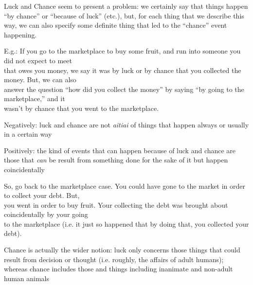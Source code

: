 \documentclass[11pt]{article}
\begin{document}
\noindent Luck and Chance seem to present a problem: we certainly say that things happen ``by chance'' or ``because of luck'' (etc.), but, for each thing that we describe this way, we can also specify some definite thing that led to the ``chance'' event happening.
\vspace*{2mm}

E.g.: If you go to the marketplace to buy some fruit, and run into someone you did not expect to meet\\\hspace*{6mm}that owes you money, we say it was by luck or by chance that you collected the money. But, we can also\\\hspace*{6mm}answer the question ``how did you collect the money'' by saying ``by going to the marketplace,'' and it\\\hspace*{6mm}wasn't by chance that you went to the marketplace.
\vspace{2mm}

\noindent Negatively: luck and chance are not \emph{aitiai} of things that happen always or usually in a certain way
\vspace*{2mm}

\noindent Positively: the kind of events that can happen because of luck and chance are those that \emph{can}  be result from something done for the sake of it but happen coincidentally
\vspace*{2mm}

So, go back to the marketplace case. You could have gone to the market in order to collect your debt. But,\\\hspace*{6mm}you went in order to buy fruit. Your collecting the debt was brought about coincidentally by your going\\\hspace*{6mm}to the marketplace (i.e. it just so happened that by doing that, you collected your debt).
\vspace*{2mm}

\noindent Chance is actually the wider notion: luck only concerns those things that could result from decision or thought (i.e. roughly, the affairs of adult humans); whereas chance includes those and things including inanimate and non-adult human animals
\end{document}
